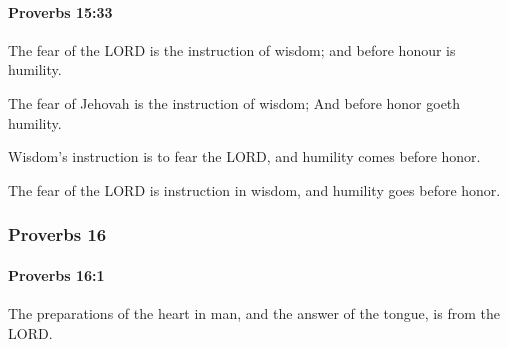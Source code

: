 		\paragraph{Proverbs 15:33} %
			\label{PROVERBS-15-33}

			The fear of the LORD is the instruction of wisdom; and before honour is humility.

			\begin{versebox}
					\item[BHS] 
					\item[ASV] The fear of Jehovah is the instruction of wisdom; And before honor goeth humility.
					\item[NIV] Wisdom’s instruction is to fear the LORD, and humility comes before honor.
					\item[NRSV] The fear of the LORD is instruction in wisdom, and humility goes before honor.
			\end{versebox}
	\subsubsection{Proverbs 16} %
		\label{PROVERBS-16}

		\paragraph{Proverbs 16:1} %
			\label{PROVERBS-16-1}

			The preparations of the heart in man, and the answer of the tongue, is from the LORD.

